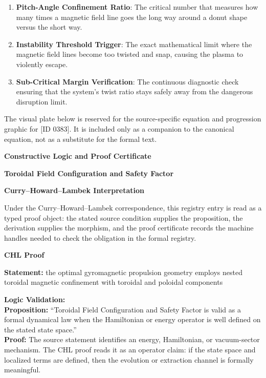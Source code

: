 \begin{enumerate}[leftmargin=1.6em,itemsep=6pt,topsep=4pt]
\item \textbf{Pitch-Angle Confinement Ratio}: The critical number that measures how many times a magnetic field line goes the long way around a donut shape versus the short way.
\item \textbf{Instability Threshold Trigger}: The exact mathematical limit where the magnetic field lines become too twisted and snap, causing the plasma to violently escape.
\item \textbf{Sub-Critical Margin Verification}: The continuous diagnostic check ensuring that the system's twist ratio stays safely away from the dangerous disruption limit.
\end{enumerate}

\begingroup\footnotesize\sloppy
The visual plate below is reserved for the source-specific equation and progression graphic for [ID 0383]. It is included only as a companion to the canonical equation, not as a substitute for the formal text.
\par\endgroup
\ifTZPDarkEdition
{}
\fi

\clearpage
\begingroup\tzpsupportsetup
\noindent\textbf{\fontsize{10.8pt}{12.8pt}\selectfont [ID 0383] Constructive Logic and Proof Certificate}\par
\noindent\textbf{\fontsize{10pt}{12pt}\selectfont Toroidal Field Configuration and Safety Factor}\par
\vspace{0.45em}
\begingroup
\footnotesize
\setlength{\parskip}{0.22em}
\setlength{\parindent}{0pt}
\noindent\textbf{Curry--Howard--Lambek Interpretation}\par
Under the Curry--Howard--Lambek correspondence, this registry entry is read as a typed proof
object: the stated source condition supplies the proposition, the derivation supplies the
morphism, and the proof certificate records the machine handles needed to check the obligation
in the formal registry.

\vspace{0.45em}
\noindent\textbf{CHL Proof}\par
\textbf{Statement:} the optimal gyromagnetic propulsion geometry employs nested toroidal magnetic
confinement with toroidal and poloidal components

\textbf{Logic Validation:}\\
\textbf{Proposition:} ``Toroidal Field Configuration and Safety Factor is valid as a formal dynamical law when
the Hamiltonian or energy operator is well defined on the stated state space.''\\
\textbf{Proof:} The source statement identifies an energy, Hamiltonian, or vacuum-sector mechanism. The
CHL proof reads it as an operator claim: if the state space and localized terms are
defined, then the evolution or extraction channel is formally meaningful.

